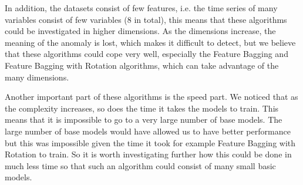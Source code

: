\documentclass[a4paper,12pt]{report}
\theoremstyle{definitionNODot}
\begin{document}
	In addition, the datasets consist of few features, i.e. the time series of many variables consist of few variables (8 in total), this means that these algorithms could be investigated in higher dimensions. As the dimensions increase, the meaning of the anomaly is lost, which makes it difficult to detect, but we believe that these algorithms could cope very well, especially the Feature Bagging and Feature Bagging with Rotation algorithms, which can take advantage of the many dimensions.
	
	Another important part of these algorithms is the speed part. We noticed that as the complexity increases, so does the time it takes the models to train. This means that it is impossible to go to a very large number of base models. The large number of base models would have allowed us to have better performance but this was impossible given the time it took for example Feature Bagging with Rotation to train. So it is worth investigating further how this could be done in much less time so that such an algorithm could consist of many small basic models.
	
	
	
	
	
	
\end{document}
